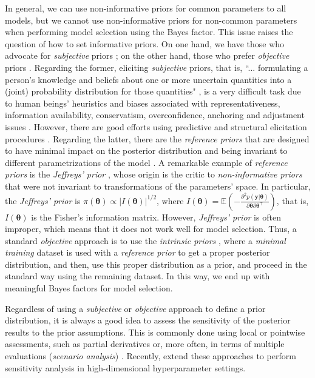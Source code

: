 In general, we can use non-informative priors for common parameters to all models, but we cannot use non-informative priors for non-common parameters when performing model selection using the Bayes factor. This issue raises the question of how to set informative priors. On one hand, we have those who advocate for \textit{subjective} priors \cite{Ramsey1926, deFinetti1937, savage1954, Lindley2000}; on the other hand, those who prefer  \textit{objective} priors \cite{Bayes1763, Laplace1812, Jeffreys1961, Berger2006}. Regarding the former, eliciting \textit{subjective} priors, that is, ``... formulating a person's knowledge and beliefs about one or more uncertain quantities into a (joint) probability distribution for those quantities" \cite{garthwaite05}, is a very difficult task due to human beings' heuristics and biases associated with representativeness, information availability, conservatism, overconfidence, anchoring and adjustment issues \cite{tversky74}. However, there are good efforts using predictive and structural elicitation procedures \cite{Kadane80,kadane98}. Regarding the latter, there are the \textit{reference priors} that are designed to have minimal impact on the posterior distribution and being invariant to different parametrizations of the model \cite[Chap.~5]{bernardo2009bayesian}. A remarkable example of \textit{reference priors} is the \textit{Jeffreys' prior} \cite{jeffreys1946invariant}, whose origin is the critic to \textit{non-informative priors} that were not invariant to transformations of the parameters' space. In particular, the \textit{Jeffreys' prior} is $\pi(\bm{\theta})\propto |I(\bm{\theta})|^{1/2}$, where $I(\bm{\theta})=\mathbb{E}\left(-\frac{\partial^2p(\bm{y}|\bm{\theta})}{\partial \bm{\theta}\partial \bm{\theta}^{\top}}\right)$, that is, $I(\bm{\theta})$ is the Fisher's information matrix. However, \textit{Jeffreys' prior} is often improper, which means that it does not work well for model selection. Thus, a standard \textit{objective} approach is to use the \textit{intrinsic priors} \cite{berger1996intrinsic}, where a \textit{minimal training} dataset is used with a \textit{reference prior} to get a proper posterior distribution, and then, use this proper distribution as a prior, and proceed in the standard way using the remaining dataset. In this way, we end up with meaningful Bayes factors for model selection.

Regardless of using a \textit{subjective} or \textit{objective} approach to define a prior distribution, it is always a good idea to assess the sensitivity of the posterior results to the prior assumptions. This is commonly done using local or pointwise assessments, such as partial derivatives \cite{giordano2022evaluating,Jacobi2022,gustafson2000local} or, more often, in terms of multiple evaluations (\textit{scenario analysis}) \cite{richardson1997bayesian, kim1999has, an2007bayesian}. Recently, \cite{jacobi2024posterior} extend these approaches to perform sensitivity analysis in high-dimensional hyperparameter settings. 

